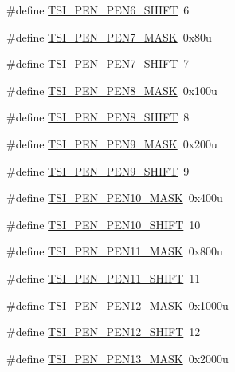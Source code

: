\begin{DoxyCompactItemize}
\#define \hyperlink{group___t_s_i___register___masks_ga3c47b02418ccd8b31132ecfdd45bdd9c}{T\+S\+I\+\_\+\+P\+E\+N\+\_\+\+P\+E\+N6\+\_\+\+S\+H\+I\+FT}~6
\item 
\#define \hyperlink{group___t_s_i___register___masks_ga647e31fe5802735f69fa70e752b881b3}{T\+S\+I\+\_\+\+P\+E\+N\+\_\+\+P\+E\+N7\+\_\+\+M\+A\+SK}~0x80u
\item 
\#define \hyperlink{group___t_s_i___register___masks_ga8a68b8de1664c9980b3f742c8a1427c2}{T\+S\+I\+\_\+\+P\+E\+N\+\_\+\+P\+E\+N7\+\_\+\+S\+H\+I\+FT}~7
\item 
\#define \hyperlink{group___t_s_i___register___masks_ga98c6aab58655c83b856f21f804c7c439}{T\+S\+I\+\_\+\+P\+E\+N\+\_\+\+P\+E\+N8\+\_\+\+M\+A\+SK}~0x100u
\item 
\#define \hyperlink{group___t_s_i___register___masks_ga822574504a16f31bf6172fc5b582f963}{T\+S\+I\+\_\+\+P\+E\+N\+\_\+\+P\+E\+N8\+\_\+\+S\+H\+I\+FT}~8
\item 
\#define \hyperlink{group___t_s_i___register___masks_ga614663f54a6b349074b981f83bda0e84}{T\+S\+I\+\_\+\+P\+E\+N\+\_\+\+P\+E\+N9\+\_\+\+M\+A\+SK}~0x200u
\item 
\#define \hyperlink{group___t_s_i___register___masks_ga23492a8b439df4e9414fbae2cf54742f}{T\+S\+I\+\_\+\+P\+E\+N\+\_\+\+P\+E\+N9\+\_\+\+S\+H\+I\+FT}~9
\item 
\#define \hyperlink{group___t_s_i___register___masks_ga4a5e83e197e558ed636a8531f63a51a0}{T\+S\+I\+\_\+\+P\+E\+N\+\_\+\+P\+E\+N10\+\_\+\+M\+A\+SK}~0x400u
\item 
\#define \hyperlink{group___t_s_i___register___masks_gae26e707910b5a4ed3a2bfc7397c7fdf8}{T\+S\+I\+\_\+\+P\+E\+N\+\_\+\+P\+E\+N10\+\_\+\+S\+H\+I\+FT}~10
\item 
\#define \hyperlink{group___t_s_i___register___masks_ga2692c92efabc1272aadd492fedaf8117}{T\+S\+I\+\_\+\+P\+E\+N\+\_\+\+P\+E\+N11\+\_\+\+M\+A\+SK}~0x800u
\item 
\#define \hyperlink{group___t_s_i___register___masks_ga7cf23edbaaf2d70825a3af3774076230}{T\+S\+I\+\_\+\+P\+E\+N\+\_\+\+P\+E\+N11\+\_\+\+S\+H\+I\+FT}~11
\item 
\#define \hyperlink{group___t_s_i___register___masks_ga686745e0ce974aeda129cb1ad92792b5}{T\+S\+I\+\_\+\+P\+E\+N\+\_\+\+P\+E\+N12\+\_\+\+M\+A\+SK}~0x1000u
\item 
\#define \hyperlink{group___t_s_i___register___masks_ga4e6356a9326382d6696b9249ad74ec3b}{T\+S\+I\+\_\+\+P\+E\+N\+\_\+\+P\+E\+N12\+\_\+\+S\+H\+I\+FT}~12
\item 
\#define \hyperlink{group___t_s_i___register___masks_ga47604061f85253c63ae3846adea3f36a}{T\+S\+I\+\_\+\+P\+E\+N\+\_\+\+P\+E\+N13\+\_\+\+M\+A\+SK}~0x2000u

\end{DoxyCompactItemize}
